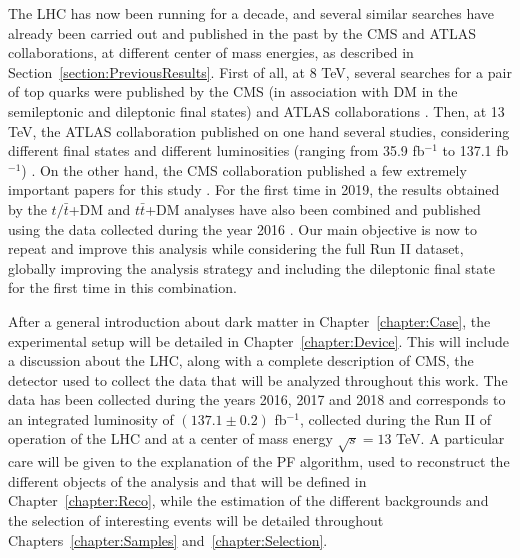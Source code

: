 \documentclass[a4paper, 10pt, openright]{report}
\begin{document}
The \ac{LHC} has now been running for a decade, and several similar searches have already been carried out and published in the past by the \ac{CMS} and \ac{ATLAS} collaborations, at different center of mass energies, as described in Section~\ref{section:PreviousResults}. First of all, at 8 TeV, several searches for a pair of top quarks were published by the \ac{CMS} (in association with \ac{DM} in the semileptonic \cite{PreviousDoubleTopSingleLep8CMS} and dileptonic \cite{PreviousDoubleTopDiLep8CMS} final states) and \ac{ATLAS} collaborations \cite{PreviousDoubleTopAllLep8ATLAS}. Then, at 13 TeV, the \ac{ATLAS} collaboration published on one hand several studies, considering different final states and different luminosities (ranging from 35.9 fb$^{-1}$ to 137.1 fb$^{-1}$) \cite{PreviousDoubleTopOneLep13ATLAS, PreviousDoubleTopDiLep13ATLAS, PreviousDoubleTopBottomAllLep13ATLAS,  ATLASICHEP2020}. On the other hand, the \ac{CMS} collaboration published a few extremely important papers for this study \cite{PreviousDoubleTopBottomAllLep13CMS, PreviousDoubleTopAllLep13CMS}. For the first time in 2019, the results obtained by the $t/\bar t$+DM and $t \bar t$+DM analyses have also been combined and published using the data collected during the year 2016 \cite{PreviousSingleDoubleTopAllLep13CMS}. Our main objective is now to repeat and improve this analysis while considering the full Run II dataset, globally improving the analysis strategy and including the dileptonic final state for the first time in this combination.

After a general introduction about dark matter in Chapter~\ref{chapter:Case}, the experimental setup will be detailed in Chapter~\ref{chapter:Device}. This will include a discussion about the \ac{LHC}, along with a complete description of \ac{CMS}, the detector used to collect the data that will be analyzed throughout this work. The data has been collected during the years 2016, 2017 and 2018 and corresponds to an integrated luminosity of $(137.1 \pm 0.2)$ fb$^{-1}$, collected during the Run II of operation of the \ac{LHC} and at a center of mass energy $\sqrt{s} = 13$ TeV. A particular care will be given to the explanation of the \acf{PF} algorithm, used to reconstruct the different objects of the analysis and that will be defined in Chapter~\ref{chapter:Reco}, while the estimation of the different backgrounds and the selection of interesting events will be detailed throughout Chapters~\ref{chapter:Samples} and~\ref{chapter:Selection}.
\end{document}
